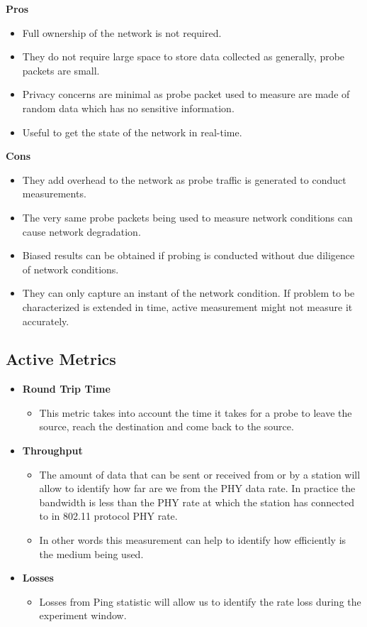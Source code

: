 \textbf{Pros}
\begin{itemize}
	\item Full ownership of the network is not required.
	\item They do not require large space to store data collected as generally, probe packets are small.
	\item Privacy concerns are minimal as probe packet used to measure are made of random data which has no sensitive information.
	\item Useful to get the state of the network in real-time.
\end{itemize}
	

\textbf{Cons}
\begin{itemize}
	\item They add overhead to the network as probe traffic is generated to conduct measurements.
	\item The very same probe packets being used to measure network conditions can cause network degradation.
	\item Biased results can be obtained if probing is conducted without due diligence of network conditions.
	\item They can only capture an instant of the network condition. If problem to be characterized is extended in time, active measurement might not measure it accurately.
\end{itemize}

\subsection*{Active Metrics}

\begin{itemize}
	\item \textbf{Round Trip Time}
	\begin{itemize}
		\item This metric takes into account the time it takes for a probe to leave the source, reach the destination and come back to the source. 
	\end{itemize}
	
	\item \textbf{Throughput}
	\begin{itemize}
		\item The amount of data that can be sent or received from or by a station will allow to identify how far are we from the PHY data rate. In practice the bandwidth is less than the PHY rate at which the station has connected to in 802.11 protocol PHY rate.
		\item In other words this measurement can help to identify how efficiently is the medium being used.
	\end{itemize}
	\item \textbf{Losses}
	\begin{itemize}
		\item Losses from Ping statistic will allow us to identify the rate loss during the experiment window.
	\end{itemize}
\end{itemize}

